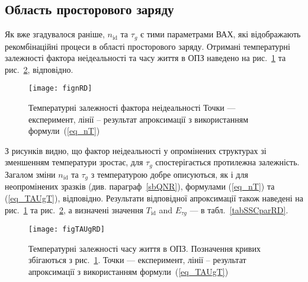 \subsection{Область просторового заряду\label{sbSCR}}

Як вже згадувалося раніше, $n_{\mathrm{id}}$ та $\tau_{g}$ є тими параметрами ВАХ, які відображають рекомбінаційні процеси в
області просторового заряду.
Отримані температурні залежності фактора неідеальності та часу життя в ОПЗ наведено на рис.~\ref{fignRD} та рис.~\ref{figTAUgRD}, відповідно.

\begin{figure}[b]
\center
\texttt{[image: fignRD]}%
\caption{\label{fignRD}
Температурні залежності фактора неідеальності
\FigCaptionSSCRD
Точки --- експеримент,
лінії -- результат апроксимації з використанням формули~(\ref{eq_nT})
}%
\end{figure}

З рисунків видно, що фактор неідеальності у опромінених структурах зі зменшенням температури зростає,
для $\tau_{g}$ спостерігається протилежна залежність.
Загалом зміни $n_{\mathrm{id}}$ та $\tau_{g}$ з температурою добре описуються, як і для неопромінених зразків (див. параграф~\ref{sbQNR}),
 формулами (\ref{eq_nT}) та
(\ref{eq_TAUgT}), відповідно.
Результати відповідної апроксимації також наведені на рис.~\ref{fignRD} та рис.~\ref{figTAUgRD},
а визначені значення $T_{\mathrm{id}}$ and $E_{\tau g}$ --- в табл.~\ref{tabSSCparRD}.




\begin{figure}
\center
\texttt{[image: figTAUgRD]}%
\caption{\label{figTAUgRD}
Температурні залежності часу життя в ОПЗ.
Позначення кривих збігаються з рис.~\ref{fignRD}.
Точки --- експеримент,
лінії -- результат апроксимації з використанням формули~(\ref{eq_TAUgT})
}%
\end{figure}


